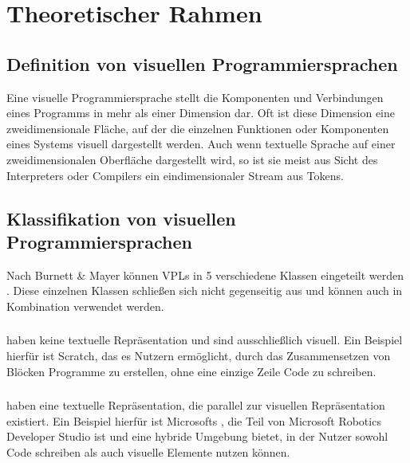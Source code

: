 \documentclass[ngerman]{article}
\begin{document}
\pagebreak

\section{Theoretischer Rahmen}

\subsection{Definition von visuellen Programmiersprachen}
Eine visuelle Programmiersprache stellt die Komponenten und Verbindungen eines Programms in mehr als einer Dimension dar. Oft ist diese Dimension eine zweidimensionale Fläche, auf der die einzelnen Funktionen oder Komponenten eines Systems visuell dargestellt werden. 
Auch wenn textuelle Sprache auf einer zweidimensionalen Oberfläche dargestellt wird, so ist sie meist aus Sicht des Interpreters oder Compilers ein eindimensionaler Stream aus Tokens. \cite{Myers}

\subsection{Klassifikation von visuellen Programmiersprachen}

Nach Burnett \& Mayer können VPLs in 5 verschiedene Klassen eingeteilt werden \cite{BURNETT1994287}. Diese einzelnen Klassen schließen sich nicht gegenseitig aus und können auch in Kombination verwendet werden.

\subsubsection{}
 haben keine textuelle Repräsentation und sind ausschließlich visuell. Ein Beispiel hierfür ist Scratch, das es Nutzern ermöglicht, durch das Zusammensetzen von Blöcken Programme zu erstellen, ohne eine einzige Zeile Code zu schreiben. \cite{mitScratchAbout}

\subsubsection{}
 haben eine textuelle Repräsentation, die parallel zur visuellen Repräsentation existiert. 
Ein Beispiel hierfür ist Microsofts , die Teil von Microsoft Robotics Developer Studio ist und eine hybride Umgebung bietet, in der Nutzer sowohl Code schreiben als auch visuelle Elemente nutzen können. \cite{microsoftIntroduction}
\end{document}
